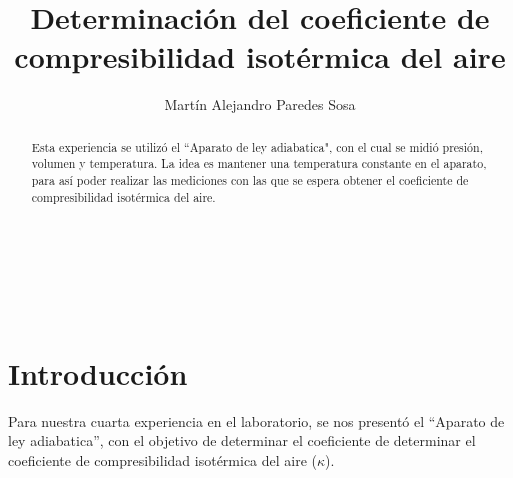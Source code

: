 \documentclass[12pt]{article}
\title{Determinación del coeficiente de compresibilidad isotérmica del aire}
\author{Martín Alejandro Paredes Sosa}
\makeatletter
\let\thetitle\@title
\let\theauthor\@author
\makeatother
\begin{document}
\begin{center}
{ \large \bfseries \thetitle}\\
\end{center}
	\begin{minipage}{\textwidth}
		\begin{center} 
			\theauthor 
			\end{center}
	\end{minipage}\\[-0.52 cm]
\begin{abstract}
	Esta experiencia se utilizó el ``Aparato de ley adiabatica", con el cual se midió presión, volumen y temperatura. La idea es mantener una temperatura constante en el aparato, para así poder realizar las mediciones con las que se espera obtener el coeficiente de compresibilidad isotérmica del aire.

\end{abstract}
\vspace{-1cm}
\section{Introducción}
	Para nuestra cuarta experiencia en el laboratorio, se nos presentó el ``Aparato de ley adiabatica'', con el objetivo de determinar el coeficiente de determinar el coeficiente de compresibilidad isotérmica del aire ($\kappa$).
	
\end{document}
